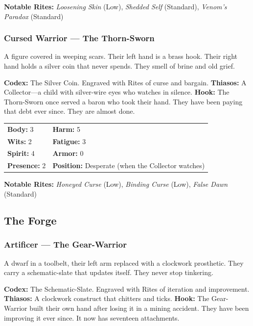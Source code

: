 \textbf{Notable Rites:} \textit{Loosening Skin} (Low), \textit{Shedded Self} (Standard), \textit{Venom's Paradox} (Standard)

\subsubsection{Cursed Warrior — The Thorn-Sworn}

A figure covered in weeping scars. Their left hand is a brass hook. Their right hand holds a silver coin that never spends. They smell of brine and old grief.

\textbf{Codex:} The Silver Coin. Engraved with Rites of curse and bargain.
\textbf{Thiasos:} A Collector—a child with silver-wire eyes who watches in silence.
\textbf{Hook:} The Thorn-Sworn once served a baron who took their hand. They have been paying that debt ever since. They are almost done.

\begin{tabular}{ll}
\textbf{Body:} 3 & \textbf{Harm:} 5 \\
\textbf{Wits:} 2 & \textbf{Fatigue:} 3 \\
\textbf{Spirit:} 4 & \textbf{Armor:} 0 \\
\textbf{Presence:} 2 & \textbf{Position:} Desperate (when the Collector watches) \\
\end{tabular}

\textbf{Notable Rites:} \textit{Honeyed Curse} (Low), \textit{Binding Curse} (Low), \textit{False Dawn} (Standard)

\subsection{The Forge}

\subsubsection{Artificer — The Gear-Warrior}

A dwarf in a toolbelt, their left arm replaced with a clockwork prosthetic. They carry a schematic-slate that updates itself. They never stop tinkering.

\textbf{Codex:} The Schematic-Slate. Engraved with Rites of iteration and improvement.
\textbf{Thiasos:} A clockwork construct that chitters and ticks.
\textbf{Hook:} The Gear-Warrior built their own hand after losing it in a mining accident. They have been improving it ever since. It now has seventeen attachments.

